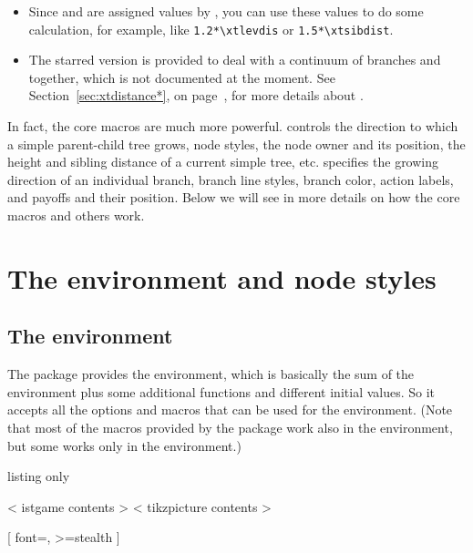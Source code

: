 \remark

\begin{itemize}
\item Since \cmd{\xtlevdist} and \cmd{\xtsibdist} are assigned values by \cmd{\xtdistance}, you can use
these values to do some calculation, for example, like \verb+1.2*\xtlevdis+ or \verb+1.5*\xtsibdist+.
\item The starred version \icmd{\cntmdistance*} is provided to deal with a continuum of branches and \cmd{\xtdistances} together, which is not documented at the moment. 
See Section~\ref{sec:xtdistance*}, on page~\pageref{sec:xtdistance*},
for more details about \cmd{\cntmdistance*}.
\end{itemize}

In fact, the core macros are much more powerful. \cmd{\istroot} controls the direction to which a simple parent-child tree grows, 
node styles, the node owner and its position, the height and sibling distance of a current simple tree, etc.
\cmd{\istb} specifies the growing direction of an individual branch, branch line styles, branch color, action labels, and payoffs and their position. 
Below we will see in more details on how the core macros and others work.


\section{The  environment and node styles}

\subsection{The  environment}

\label{ssec:envistgame}

The package provides the  environment, which is basically the sum of the  environment plus some additional functions and different initial values.
So it accepts all the options and macros that can be used for the  environment. (Note that most of the macros provided by the package work also in the  environment, but some works only in the  environment.)

\begin{tcblisting}{listing only}
\begin{istgame}
  < istgame contents >
  < tikzpicture contents >
\end{istgame}
[ font=\normalsize , >=stealth ] 
\end{tcblisting}

